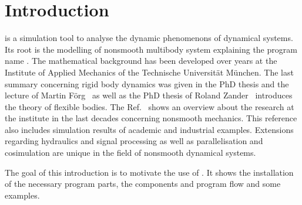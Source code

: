 \section{Introduction}
\MBSim{} is a simulation tool to analyse the dynamic phenomenons of dynamical systems. Its root is the modelling of nonsmooth multibody system explaining the program name \MBSim{}. The mathematical background has been developed over years at the Institute of Applied Mechanics of the Technische Universit\"at M\"unchen. The last summary concerning rigid body dynamics was given in the PhD thesis and the lecture of Martin F\"org~\cite{Foer06,Foer07} as well as the PhD thesis of Roland Zander~\cite{Zan08a} introduces the theory of flexible bodies. The Ref.~\cite{Zan08} shows an overview about the research at the institute in the last decades concerning nonsmooth mechanics. This reference also includes simulation results of academic and industrial examples. Extensions regarding hydraulics and signal processing as well as parallelisation and cosimulation are unique in the field of nonsmooth dynamical systems.\par
The goal of this introduction is to motivate the use of \MBSim{}. It shows the installation of the necessary program parts, the components and program flow and some examples. 


